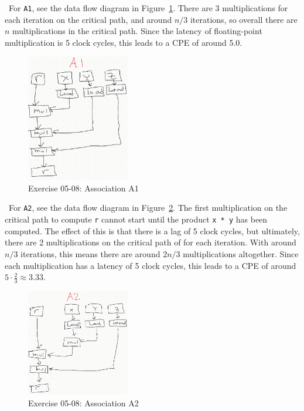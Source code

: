 \documentclass[12pt]{article}
\newenvironment{sol}[1][Solution]{\begin{trivlist}
		\item[\hskip \labelsep {\bfseries #1:}]}{\end{trivlist}}
\begin{document}
\begin{sol}
	\
	For \texttt{A1}, see the data flow diagram in Figure~\ref{fig:ex-05-08-a1}. There are
	3 multiplications for each iteration on the critical path, and around $n/3$ iterations,
	so overall there are $n$ multiplications in the critical path. Since the latency of
	floating-point multiplication is 5 clock cycles, this leads to a CPE of around 5.0.
	\begin{figure}
		\centering
		\includegraphics[width=0.4\textwidth]{exercise-05-08-a1.png}
		\caption{Exercise 05-08: Association A1}
		\label{fig:ex-05-08-a1}
	\end{figure}
	
	\
	For \texttt{A2}, see the data flow diagram in Figure~\ref{fig:ex-05-08-a2}. The first
	multiplication on the critical path to compute \texttt{r} cannot start until the
	product \texttt{x * y} has been computed. The effect of this is that there is a lag
	of 5 clock cycles, but ultimately, there are 2 multiplications on the critical path
	of for each iteration. With around $n/3$ iterations, this means there are around
	$2n/3$ multiplications altogether. Since each multiplication has a latency of 5 clock
	cycles, this leads to a CPE of around $5\cdot \frac{2}{3}\approx 3.33$.
	\begin{figure}
		\centering
		\includegraphics[width=0.4\textwidth]{exercise-05-08-a2.png}
		\caption{Exercise 05-08: Association A2}
		\label{fig:ex-05-08-a2}
	\end{figure}


\end{sol}
\end{document}
